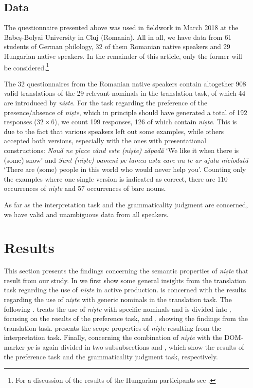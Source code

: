 \documentclass[output=paper,colorlinks,citecolor=brown]{langscibook}
\begin{document}
\subsection{Data}\label{sec:ds3.2}
The questionnaire presented above was used in fieldwork in March 2018 at the Babeș-Bolyai University in Cluj (Romania). All in all, we have data from 61 students of German philology, 32 of them Romanian native speakers and 29 Hungarian native speakers. In the remainder of this article, only the former will be considered.\footnote{For a discussion of the results of the Hungarian participants see \citet{Davatz2018}.} 

The 32 questionnaires from the Romanian native speakers contain altogether 908 valid translations of the 29 relevant nominals in the translation task, of which 44 are introduced by \textit{niște}. For the task regarding the preference of the presence\slash absence of \textit{niște}, which in principle should have generated a total of 192 responses ($32 \times 6$), we count 199 responses, 126 of which contain \textit{niște}. This is due to the fact that various speakers left out some examples, while others accepted both versions, especially with the ones with presentational constructions: \textit{Nou\u{a} ne place când este (niște) z\u{a}pad\u{a}} ‘We like it when there is (some) snow’ and \textit{Sunt (niște) oameni pe lumea asta care nu te-ar ajuta niciodat\u{a}} ‘There are (some) people in this world who would never help you’. Counting only the examples where one single version is indicated as correct, there are 110 occurrences of \textit{niște} and 57 occurrences of bare nouns.

As far as the interpretation task and the grammaticality judgment are concerned, we have valid and unambiguous data from all speakers.


\section{Results}\label{sec:ds4}
This section presents the findings concerning the semantic properties of \textit{niște} that result from our study. In  we first show some general insights from the translation task regarding the use of \textit{niște} in active production.  is concerned with the results regarding the use of \textit{niște} with generic nominals in the translation task. The following . treats the use of \textit{niște} with specific nominals and is divided into , focusing on the results of the preference task, and , showing the findings from the translation task.  presents the scope properties of \textit{niște} resulting from the interpretation task. Finally,  concerning the combination of \textit{niște} with the DOM-marker \textit{pe} is again divided in two subsubsections  and , which show the results of the preference task and the grammaticality judgment task, respectively.
\end{document}
